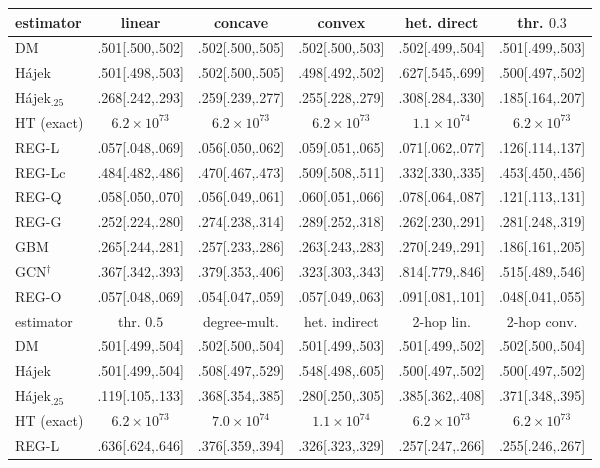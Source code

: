 \footnotesize\setlength{\tabcolsep}{2.6pt}
\begin{tabular}{lccccc}
\toprule
estimator & linear & concave & convex & het. direct & thr. $0.3$ \\
\midrule
DM & .501[.500,.502] & .502[.500,.505] & .502[.500,.503] & .502[.499,.504] & .501[.499,.503] \\
H\'ajek & .501[.498,.503] & .502[.500,.505] & .498[.492,.502] & .627[.545,.699] & .500[.497,.502] \\
H\'ajek$_{.25}$ & .268[.242,.293] & .259[.239,.277] & .255[.228,.279] & .308[.284,.330] & .185[.164,.207] \\
HT (exact) & $6.2\!\times\!10^{73}$ & $6.2\!\times\!10^{73}$ & $6.2\!\times\!10^{73}$ & $1.1\!\times\!10^{74}$ & $6.2\!\times\!10^{73}$ \\
REG-L & .057[.048,.069] & .056[.050,.062] & .059[.051,.065] & .071[.062,.077] & .126[.114,.137] \\
REG-Lc & .484[.482,.486] & .470[.467,.473] & .509[.508,.511] & .332[.330,.335] & .453[.450,.456] \\
REG-Q & .058[.050,.070] & .056[.049,.061] & .060[.051,.066] & .078[.064,.087] & .121[.113,.131] \\
REG-G & .252[.224,.280] & .274[.238,.314] & .289[.252,.318] & .262[.230,.291] & .281[.248,.319] \\
GBM & .265[.244,.281] & .257[.233,.286] & .263[.243,.283] & .270[.249,.291] & .186[.161,.205] \\
GCN$^{\dagger}$ & .367[.342,.393] & .379[.353,.406] & .323[.303,.343] & .814[.779,.846] & .515[.489,.546] \\
REG-O & .057[.048,.069] & .054[.047,.059] & .057[.049,.063] & .091[.081,.101] & .048[.041,.055] \\
\midrule
estimator & thr. $0.5$ & degree-mult. & het. indirect & 2-hop lin. & 2-hop conv. \\
\midrule
DM & .501[.499,.504] & .502[.500,.504] & .501[.499,.503] & .501[.499,.502] & .502[.500,.504] \\
H\'ajek & .501[.499,.504] & .508[.497,.529] & .548[.498,.605] & .500[.497,.502] & .500[.497,.502] \\
H\'ajek$_{.25}$ & .119[.105,.133] & .368[.354,.385] & .280[.250,.305] & .385[.362,.408] & .371[.348,.395] \\
HT (exact) & $6.2\!\times\!10^{73}$ & $7.0\!\times\!10^{74}$ & $1.1\!\times\!10^{74}$ & $6.2\!\times\!10^{73}$ & $6.2\!\times\!10^{73}$ \\
REG-L & .636[.624,.646] & .376[.359,.394] & .326[.323,.329] & .257[.247,.266] & .255[.246,.267] \\

\end{tabular}
